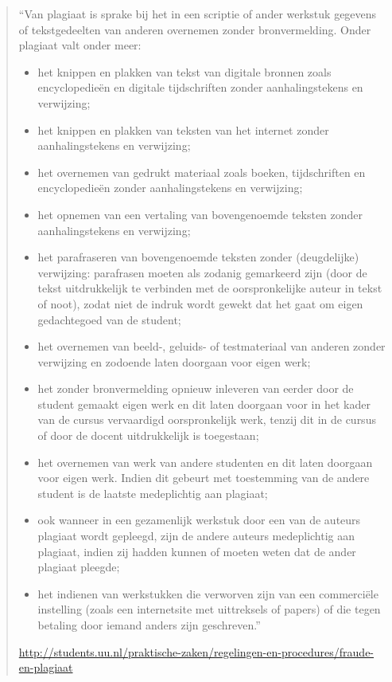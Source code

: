 \documentclass[
]{book}
\begin{document}
\begin{quote}
``Van plagiaat is sprake bij het in een scriptie of ander werkstuk
gegevens of tekstgedeelten van anderen overnemen zonder
bronvermelding. Onder plagiaat valt onder meer:

\begin{itemize}
\item
  het knippen en plakken van tekst van digitale bronnen zoals
  encyclopedieën en digitale tijdschriften zonder aanhalingstekens
  en verwijzing;
\item
  het knippen en plakken van teksten van het internet zonder
  aanhalingstekens en verwijzing;
\item
  het overnemen van gedrukt materiaal zoals boeken, tijdschriften en
  encyclopedieën zonder aanhalingstekens en verwijzing;
\item
  het opnemen van een vertaling van bovengenoemde teksten zonder
  aanhalingstekens en verwijzing;
\item
  het parafraseren van bovengenoemde teksten zonder (deugdelijke)
  verwijzing: parafrasen moeten als zodanig gemarkeerd zijn (door de
  tekst uitdrukkelijk te verbinden met de oorspronkelijke auteur in
  tekst of noot), zodat niet de indruk wordt gewekt dat het gaat om
  eigen gedachtegoed van de student;
\item
  het overnemen van beeld-, geluids- of testmateriaal van anderen
  zonder verwijzing en zodoende laten doorgaan voor eigen werk;
\item
  het zonder bronvermelding opnieuw inleveren van eerder door de
  student gemaakt eigen werk en dit laten doorgaan voor in het kader
  van de cursus vervaardigd oorspronkelijk werk, tenzij dit in de
  cursus of door de docent uitdrukkelijk is toegestaan;
\item
  het overnemen van werk van andere studenten en dit laten doorgaan
  voor eigen werk. Indien dit gebeurt met toestemming van de andere
  student is de laatste medeplichtig aan plagiaat;
\item
  ook wanneer in een gezamenlijk werkstuk door een van de auteurs
  plagiaat wordt gepleegd, zijn de andere auteurs medeplichtig aan
  plagiaat, indien zij hadden kunnen of moeten weten dat de ander
  plagiaat pleegde;
\item
  het indienen van werkstukken die verworven zijn van een
  commerciële instelling (zoals een internetsite met uittreksels of
  papers) of die tegen betaling door iemand anders zijn geschreven.''
\end{itemize}

\url{http://students.uu.nl/praktische-zaken/regelingen-en-procedures/fraude-en-plagiaat}
\end{quote}
\end{document}
